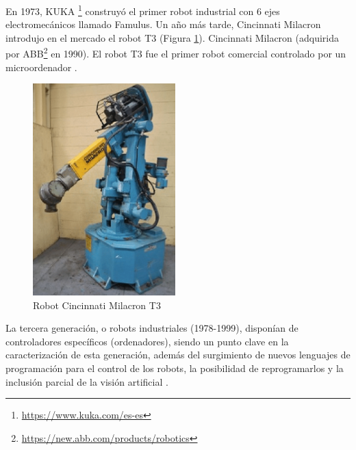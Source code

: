   
  
En 1973, KUKA  \footnote{\url{https://www.kuka.com/es-es}} construyó el primer robot industrial con 6 ejes electromecánicos llamado Famulus. Un año más tarde, Cincinnati Milacron introdujo en el mercado el robot T3 (Figura \ref{fig:T3}). Cincinnati Milacron (adquirida por ABB\footnote{\url{https://new.abb.com/products/robotics}} en 1990). El robot T3 fue el primer robot comercial controlado por un microordenador \cite{Zamalloa17}.\\
  
  \begin{figure} [H]
    \begin{center}
      \includegraphics[width=55mm]{figs/T3_robot.png}
    \end{center}
    \caption{Robot Cincinnati Milacron T3}
    \label{fig:T3}
  \end{figure}
  
La tercera generación, o robots industriales (1978-1999), disponían de controladores específicos (ordenadores), siendo un punto clave en la caracterización de esta generación, además del surgimiento de nuevos lenguajes de programación para el control de los robots, la posibilidad de reprogramarlos y la inclusión parcial de la visión artificial \cite{Zamalloa17}. %

